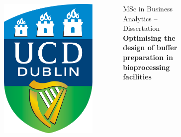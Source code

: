 \documentclass{beamer}
\begin{document}
\begin{frame}
    \begin{columns}
            \begin{figure}
                \centering
                \includegraphics[angle=0,scale=0.03]{ucd_logo.png}
            \end{figure}
        \centering MSc in Business Analytics -- Dissertation\\
        \large \textbf{Optimising the design of buffer 
                       preparation in bioprocessing facilities}
            \begin{figure}
                \centering

\end{figure}
\end{columns}
\end{frame}
\end{document}
